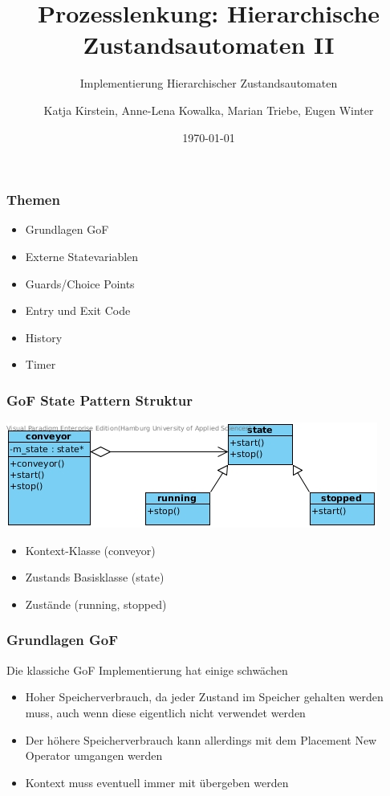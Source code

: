 \documentclass{beamer}
\title{Prozesslenkung: Hierarchische Zustandsautomaten II}
\subtitle{Implementierung Hierarchischer Zustandsautomaten}
\author{Katja Kirstein, Anne-Lena Kowalka, Marian Triebe, Eugen Winter}
\date{\today}
\begin{document}
\begin{frame}
\titlepage
\end{frame}

\begin{frame}
 \frametitle{Themen}
 \begin{itemize}
  \item Grundlagen GoF
  \item Externe Statevariablen
  \item Guards/Choice Points
  \item Entry und Exit Code
  \item History
  \item Timer
 \end{itemize}
\end{frame}

\begin{frame}
 \frametitle{GoF State Pattern Struktur}
 \includegraphics[scale=.6]{img/fsm_gof.jpg}
 \begin{itemize}
  \item Kontext-Klasse (conveyor)
  \item Zustands Basisklasse (state)
  \item Zust\"ande (running, stopped)
 \end{itemize}
\end{frame}

\begin{frame}
 \frametitle{Grundlagen GoF}
 Die klassiche GoF Implementierung hat einige schw\"achen
 \begin{itemize}
  \item Hoher Speicherverbrauch, da jeder Zustand im Speicher gehalten werden muss, auch wenn diese eigentlich nicht verwendet werden
  \item Der h\"ohere Speicherverbrauch kann allerdings mit dem Placement New Operator umgangen werden
  \item Kontext muss eventuell immer mit \"ubergeben werden
 \end{itemize}
\end{frame}
\end{document}
